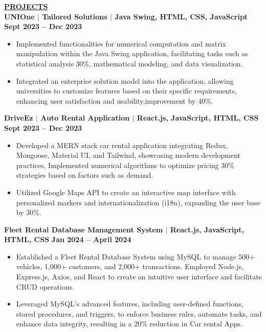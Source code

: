 \documentclass{article}
\begin{document}
\noindent \textbf{\underline{PROJECTS}} \\
\textbf{\textbf{UNIOne } $\mid$ Tailored Solutions $\mid$ Java Swing, HTML, CSS, JavaScript} \hfill {\textbf{\textbf{Sept 2023 – Dec 2023} }}
\begin{itemize}[noitemsep,nolistsep,leftmargin=*]
   \item Implemented functionalities for numerical computation and matrix manipulation within the Java Swing application, facilitating tasks such as statistical analysis 30\%, mathematical modeling, and data visualization.
    \item Integrated an enterprise solution model into the application, allowing universities to customize features based on their specific requirements, enhancing user satisfaction and usability,improvement by 40\%.

\end{itemize}
\textbf{\textbf{DriveEz } $\mid$ Auto Rental Application $\mid$ React.js, JavaScript, HTML, CSS} \hfill \textbf{\textbf{Sept 2023 – Dec 2023}}
\begin{itemize}[noitemsep,nolistsep,leftmargin=*]
    \item Developed a MERN stack car rental application integrating Redux, Mongoose, Material UI, and Tailwind, showcasing modern development practices, Implemented numerical algorithms to optimize pricing 30\% strategies based on factors such as demand.
    \item Utilized Google Maps API to create an interactive map interface with personalized markers and internationalization (i18n), expanding the user base by 30\%.

\end{itemize}
\textbf{\textbf{Fleet Rental Database Management System $\mid$ React.js, JavaScript, HTML, CSS}  } \hfill \textbf{\textbf{Jan 2024 – April 2024} }
\begin{itemize}[noitemsep,nolistsep,leftmargin=*]
  \item Established a Fleet Rental Database System using MySQL to manage 500+ vehicles, 1,000+ customers, and 2,000+ transactions. Employed Node.js, Express.js, Axios, and React to create an intuitive user interface and facilitate CRUD operations.
    \item Leveraged MySQL's advanced features, including user-defined functions, stored procedures, and triggers, to enforce business rules, automate tasks, and enhance data integrity, resulting in a 20\% reduction in Car rental Apps.


\end{itemize}
\end{document}

